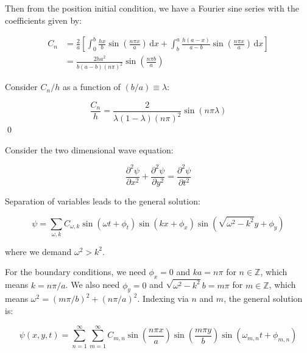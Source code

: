 \documentclass[12pt]{article}
\begin{document}
Then from the position initial condition, we have a Fourier sine series with the coefficients given by:

\begin{equation}
    \begin{split}
        C_{n} &= \frac{2}{a} \left[ \int_{0}^{b} \frac{hx}{b} \sin{\left( \frac{n \pi x}{a} \right)} \, \mathrm{d}x + \int_{b}^{a} \frac{h(a-x)}{a-b} \sin{\left( \frac{n \pi x}{a} \right)} \, \mathrm{d}x \right] \\
        &= \frac{2ha^{2}}{b(a - b)(n\pi)^{2}} \sin{\left( \frac{n \pi b}{a} \right)}
    \end{split}
\end{equation}

Consider $C_{n}/h$ as a function of $(b/a) \equiv \lambda$:

\begin{equation}
    \frac{C_{n}}{h} = \frac{2}{\lambda(1 - \lambda)(n\pi)^{2}} \sin{(n \pi \lambda)}
\end{equation}
\qed


Consider the two dimensional wave equation:

\begin{equation}
    \frac{\partial^{2} \psi}{\partial x^{2}} + \frac{\partial^{2} \psi}{\partial y^{2}} = \frac{\partial^{2} \psi}{\partial t^{2}}
\end{equation}

Separation of variables leads to the general solution:

\begin{equation}
    \psi = \sum_{\omega, k} C_{\omega, k} \sin{(\omega t + \phi_{t})} \sin{(k x + \phi_{x})} \sin{(\sqrt{\omega^{2} - k^{2}} y + \phi_{y})}
\end{equation}

where we demand $\omega^{2} > k^{2}$.

For the boundary conditions, we need $\phi_{x} = 0$ and $ka = n \pi$ for $n \in \mathbb{Z}$, which means $k = n \pi/a$. We also need $\phi_{y} = 0$ and $\sqrt{\omega^{2} - k^{2}} b = m \pi$ for $m \in \mathbb{Z}$, which means $\omega^{2} = (m \pi/b)^{2} + (n \pi/a)^{2}$. Indexing via $n$ and $m$, the general solution is:

\begin{equation}
    \psi(x, y, t) = \sum_{n = 1}^{\infty} \sum_{m = 1}^{\infty} C_{m, n} \sin{\left( \frac{n \pi x}{a} \right)} \sin{\left( \frac{m \pi y}{b} \right)} \sin{\left( \omega_{m, n} t + \phi_{m, n} \right)}
\end{equation}
\end{document}
